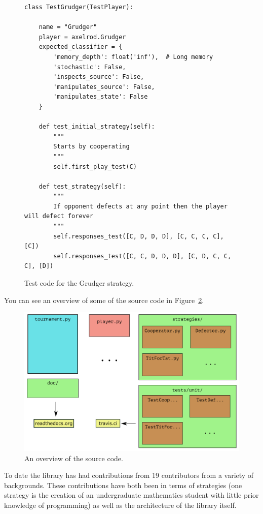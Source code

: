 \documentclass{article}
\begin{document}
\begin{figure}[!hbtp]
    \begin{verbatim}
class TestGrudger(TestPlayer):

    name = "Grudger"
    player = axelrod.Grudger
    expected_classifier = {
        'memory_depth': float('inf'),  # Long memory
        'stochastic': False,
        'inspects_source': False,
        'manipulates_source': False,
        'manipulates_state': False
    }

    def test_initial_strategy(self):
        """
        Starts by cooperating
        """
        self.first_play_test(C)

    def test_strategy(self):
        """
        If opponent defects at any point then the player will defect forever
        """
        self.responses_test([C, D, D, D], [C, C, C, C], [C])
        self.responses_test([C, C, D, D, D], [C, D, C, C, C], [D])
    \end{verbatim}
    \caption{Test code for the Grudger strategy.}
    \label{fig:grudger_test}
\end{figure}

You can see an overview of some of the source code in Figure~\ref{fig:overview}.

\begin{figure}[!hbtp]
    \centering
    \includegraphics[width=.8\textwidth]{../img/outline_of_library.pdf}
    \caption{An overview of the source code.}
    \label{fig:overview}
\end{figure}

To date the library has had contributions from 19 contributors from a variety of
backgrounds. These contributions have both been in terms of strategies (one
strategy is the creation of an undergraduate mathematics student with little
prior knowledge of programming) as well as the architecture of the library
itself.
\end{document}
